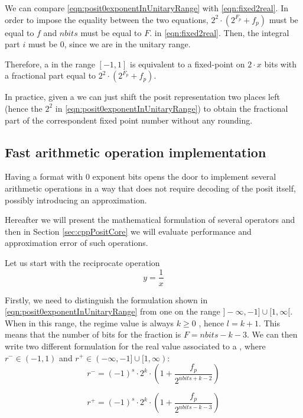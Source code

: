 We can compare \eqref{eqn:posit0exponentInUnitaryRange} with \eqref{eqn:fixed2real}. In order to impose the equality between the two equations, $2^2 \cdot ( 2^{F_p} + f_p )$ must be equal to $f$ and $nbits$ must be equal to $F$. in \eqref{eqn:fixed2real}. Then, the integral part $i$ must be 0, since we are in the unitary range.

Therefore,  a  in the range $[-1,1]$ is equivalent to a fixed-point on $2\cdot x$ bits with a fractional part equal to $2^2 \cdot ( 2^{F_p} + f_p )$.

In practice, given a  we can just shift the posit representation two places left (hence the $2^2$ in \eqref{eqn:posit0exponentInUnitaryRange}) to obtain the fractional part of the correspondent fixed point number without any rounding.


\subsection{Fast arithmetic operation implementation
}\label{subsec:fastArithOps}

Having a format with $0$ exponent bits opens the door to implement several arithmetic operations in a way that does not require decoding of the posit itself, possibly introducing an approximation.

Hereafter we will present the mathematical formulation of several operators and then in Section \ref{sec:cppPositCore} we will evaluate performance and approximation error of such operations.

Let us start with the reciprocate operation \begin{equation}
    y = \frac{1}{x}
\end{equation}

Firstly, we need to distinguish the formulation shown in \eqref{eqn:posit0exponentInUnitaryRange} from one on the range  $]-\infty,-1] \cup [1,\infty[$. When in this range, the regime value is always $k \geq 0$ ,  hence $l = k + 1$. This means that the number of bits for the fraction is $F = nbits - k - 3$. We can then write two different formulation for the real value associated to a , where $r^- \in (-1,1)$ and $r^+ \in (-\infty, -1] \cup [1,\infty)$:
\begin{equation}
   r^- =  (-1)^s \cdot 2^k \cdot \left ( 1 + \frac{f_p}{2^{nbits + k - 2}} \right )
\end{equation}

\begin{equation}
   r^+ = (-1)^s \cdot 2^k \cdot \left ( 1 + \frac{f_p}{2^{nbits - k - 3}} \right )
\end{equation}


